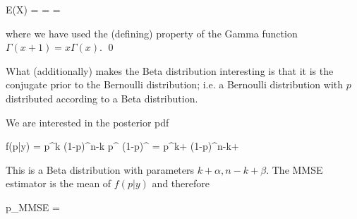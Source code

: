 \bee
E(X) =  =  = \frac{\alpha}{\alpha + \beta}
\eee

where we have used the (defining) property of the Gamma function $\Gamma(x+1) = x \Gamma(x)$. \qed


What (additionally) makes the Beta distribution interesting is that it is the conjugate prior to the Bernoulli distribution; i.e. a Bernoulli distribution with $p$ distributed according to a  Beta distribution.

We are interested in the posterior pdf 

\bee
f(p|y) =  \propto p^k (1-p)^{n-k} p^{} (1-p)^{} = p^{k+} (1-p)^{n-k+}
\eee

This is a Beta distribution with parameters $k+\alpha, n-k+\beta$. The MMSE estimator is the mean of $f(p|y)$ and therefore

\bee
\hat p_{MMSE} = 
\eee


